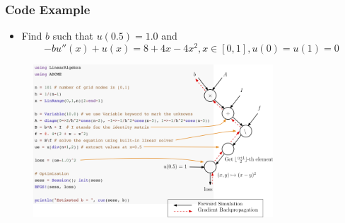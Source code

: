 \documentclass{beamer}
\begin{document}
\begin{frame}
	\frametitle{Code Example}
	\begin{itemize}
		\item  Find $b$ such that $u(0.5)=1.0$ and
		$$-bu''(x)+u(x) = 8 + 4x - 4x^2, x\in[0,1], u(0)=u(1)=0$$
	\end{itemize}
	\begin{figure}[hbt]
  \includegraphics[width=0.8\textwidth]{../code.png}
\end{figure}
\end{frame}
\end{document}
